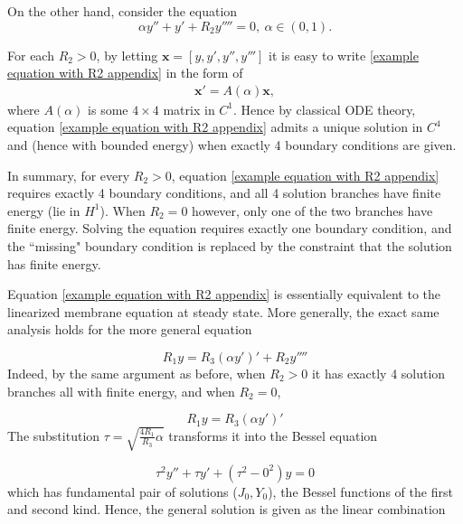\documentclass{article}[12pt]
\theoremstyle{Theorem}
\begin{document}
On the other hand, consider the equation 
 \begin{equation}
    \alpha y'' +y' + R_2y''''= 0, \ \alpha \in(0,1).
    \label{example equation with R2 appendix}
\end{equation}

For each $R_2 > 0$, by letting $\boldsymbol{x} = [y,y',y'',y''']$ it is easy to write \eqref{example equation with R2 appendix} in the form of 
\begin{eqnarray}
    \boldsymbol{x}' = A(\alpha)\boldsymbol{x},
\end{eqnarray}
where $A(\alpha)$ is some $4\times4$ matrix in $C^1$. Hence by classical ODE theory, equation \eqref{example equation with R2 appendix} admits a unique solution in $C^4$ and (hence with bounded energy) when exactly 4 boundary conditions are given.
\newline

In summary, for every $R_2 > 0$, equation \eqref{example equation with R2 appendix} requires exactly 4 boundary conditions, and all 4 solution branches have finite energy (lie in $H^1$). When $R_2 =0$ however, only one of the two branches have finite energy. Solving the equation requires exactly one boundary condition, and the ``missing" boundary condition is replaced by the constraint that the solution has finite energy.
\newline

Equation \eqref{example equation with R2 appendix} is essentially equivalent to the linearized membrane equation at steady state. More generally, the exact same analysis holds for the more general equation 

\begin{equation}
    R_1y =  R_3(\alpha y')' + R_2y''''
    \label{general example equation with R2 appendix}
\end{equation}
Indeed, by the same argument as before, when $R_2 >0$ it has exactly 4 solution branches all with finite energy, and when $R_2 =0$, 

\begin{equation}
    R_1y =  R_3(\alpha y')'
    \label{general example equation appendix}
\end{equation}
The substitution $\tau = \sqrt{\frac{4R_1}{R_3}\alpha}$ transforms it into the Bessel equation

\begin{equation}
    \tau^2y'' + \tau y' + (\tau^2 -0^2) y =0
\end{equation}
which has fundamental pair of solutions ($J_0, Y_0$), the Bessel functions of the first and second kind. Hence, the general solution is given as the linear combination
\end{document}
